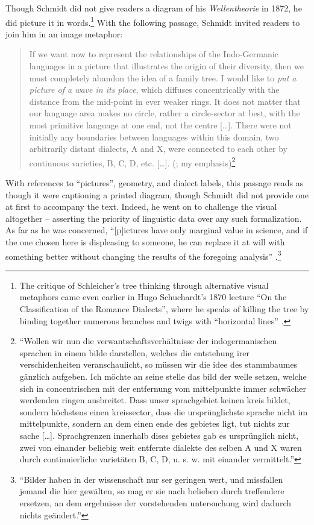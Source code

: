 \documentclass[output=paper]{langscibook}
\begin{document}
Though Schmidt did not give readers a diagram of his \emph{Wellentheorie} in 1872, he did picture it in words.\footnote{The critique of Schleicher's tree thinking through alternative visual metaphors came even earlier in Hugo Schuchardt's 1870 lecture ``On the Classification of the Romance Dialects'', where he speaks of killing the tree by binding together numerous branches and twigs with ``horizontal lines'' \citep[11]{Schuchardt19001870}.} With the following passage, Schmidt invited readers to join him in an image metaphor:

\begin{quotation}
If we want now to represent the relationships of the Indo-Germanic languages in a picture that illustrates the origin of their diversity, then we must completely abandon the idea of a family tree. I would like to \emph{put a picture of a wave in its place}, which diffuses concentrically with the distance from the mid-point in ever weaker rings. It does not matter that our language area makes no circle, rather a circle-sector at best, with the most primitive language at	one end, not the centre […]. There were not initially any boundaries between languages within this domain, two arbitrarily distant dialects, A and X, were connected to each other by continuous varieties, B, C, D, etc. […]. (\citealt[27--28]{Schmidt1872}; my emphasis)\footnote{``Wollen wir nun die verwantschaftsverhältnisse der indogermanischen sprachen in einem bilde darstellen, welches die entstehung irer verschidenheiten veranschaulicht, so müssen wir die idee des stammbaumes gänzlich aufgeben. Ich möchte an seine stelle das bild der welle setzen, welche sich in concentrischen mit der entfernung vom mittelpunkte immer schwächer werdenden ringen ausbreitet. Dass unser sprachgebiet keinen kreis bildet, sondern höchstens einen kreissector, dass die ursprünglichste sprache nicht im mittelpunkte, sondern an dem einen ende des gebietes ligt, tut nichts zur sache […]. Sprachgrenzen innerhalb dises gebietes gab es ursprünglich nicht, zwei von einander beliebig weit entfernte dialekte des selben A und X waren durch continuierliche varietäten B, C, D, u. s. w. mit einander vermittelt.''} 
\end{quotation}

With references to ``pictures'', geometry, and dialect labels, this passage reads as though it were captioning a printed diagram, though Schmidt did not provide one at first to accompany the text. Indeed, he went on to challenge the visual altogether -- asserting the priority of linguistic data over any such formalization. As far as he was concerned, ``[p]ictures have only marginal value in science, and if the one chosen here is displeasing to someone, he can replace it at will with something better without changing the results of the foregoing analysis'' \citep[28]{Schmidt1872}.\footnote{``Bilder haben in der wissenschaft nur ser geringen wert, und missfallen jemand die hier gewälten, so mag er sie nach belieben durch treffendere ersetzen, an dem ergebnisse der vorstehenden untersuchung wird dadurch nichts geändert.''}
\end{document}
